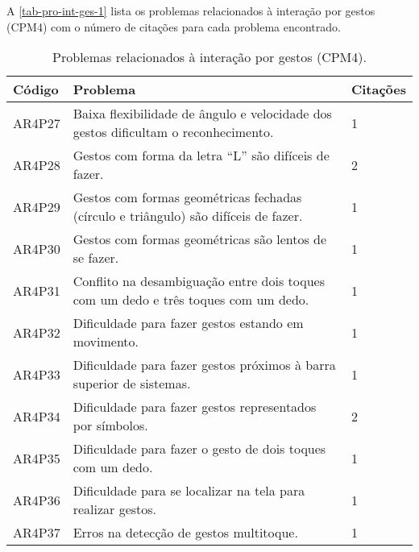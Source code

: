 A \autoref{tab-pro-int-ges-1} lista os problemas relacionados à interação por gestos (CPM4) com o número de citações para cada problema encontrado.

\begin{table}[htb]
  \begin{center}
    \ABNTEXfontereduzida
    \caption{Problemas relacionados à interação por gestos (CPM4).}
    \label{tab-pro-int-ges-1}
    \begin{tabular}{p{1.2cm}|p{12.0cm}|p{1.2cm}}
      \textbf{Código} & \textbf{Problema}                                                                  & \textbf{Citações} \\
      \hline
      AR4P27          & Baixa flexibilidade de ângulo e velocidade dos gestos dificultam o reconhecimento.  & 1                 \\
      \hline
      AR4P28          & Gestos com forma da letra “L” são difíceis de fazer.                                & 2                 \\
      \hline
      AR4P29          & Gestos com formas geométricas fechadas (círculo e triângulo) são difíceis de fazer. & 1                 \\
      \hline
      AR4P30          & Gestos com formas geométricas são lentos de se fazer.                               & 1                 \\
      \hline
      AR4P31          & Conflito na desambiguação entre dois toques com um dedo e três toques com um dedo.  & 1                 \\
      \hline
      AR4P32          & Dificuldade para fazer gestos estando em movimento.                                 & 1                 \\
      \hline
      AR4P33          & Dificuldade para fazer gestos próximos à barra superior de sistemas.                & 1                 \\
      \hline
      AR4P34          & Dificuldade para fazer gestos representados por símbolos.                           & 2                 \\
      \hline
      AR4P35          & Dificuldade para fazer o gesto de dois toques com um dedo.                          & 1                 \\
      \hline
      AR4P36          & Dificuldade para se localizar na tela para realizar gestos.                         & 1                 \\
      \hline
      AR4P37          & Erros na detecção de gestos multitoque.                                             & 1                 \\

\end{tabular}
\end{center}
\end{table}
